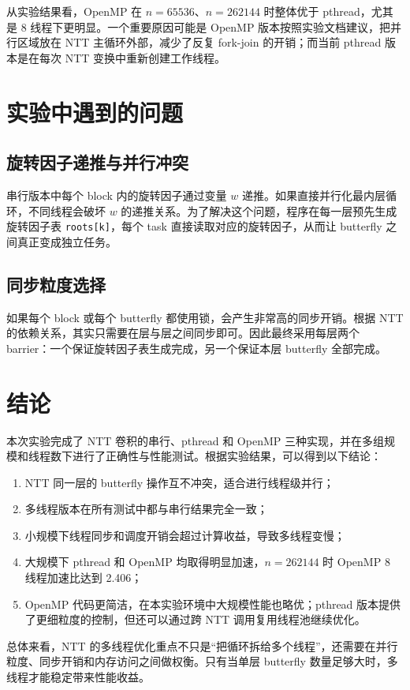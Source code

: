 \documentclass[a4paper,12pt]{ctexart}
\begin{document}
从实验结果看，OpenMP 在 $n=65536$、$n=262144$ 时整体优于 pthread，尤其是 8 线程下更明显。一个重要原因可能是 OpenMP 版本按照实验文档建议，把并行区域放在 NTT 主循环外部，减少了反复 fork-join 的开销；而当前 pthread 版本是在每次 NTT 变换中重新创建工作线程。

\section{实验中遇到的问题}

\subsection{旋转因子递推与并行冲突}

串行版本中每个 block 内的旋转因子通过变量 $w$ 递推。如果直接并行化最内层循环，不同线程会破坏 $w$ 的递推关系。为了解决这个问题，程序在每一层预先生成旋转因子表 \texttt{roots[k]}，每个 task 直接读取对应的旋转因子，从而让 butterfly 之间真正变成独立任务。

\subsection{同步粒度选择}

如果每个 block 或每个 butterfly 都使用锁，会产生非常高的同步开销。根据 NTT 的依赖关系，其实只需要在层与层之间同步即可。因此最终采用每层两个 barrier：一个保证旋转因子表生成完成，另一个保证本层 butterfly 全部完成。

\section{结论}

本次实验完成了 NTT 卷积的串行、pthread 和 OpenMP 三种实现，并在多组规模和线程数下进行了正确性与性能测试。根据实验结果，可以得到以下结论：

\begin{enumerate}
  \item NTT 同一层的 butterfly 操作互不冲突，适合进行线程级并行；
  \item 多线程版本在所有测试中都与串行结果完全一致；
  \item 小规模下线程同步和调度开销会超过计算收益，导致多线程变慢；
  \item 大规模下 pthread 和 OpenMP 均取得明显加速，$n=262144$ 时 OpenMP 8 线程加速比达到 2.406；
  \item OpenMP 代码更简洁，在本实验环境中大规模性能也略优；pthread 版本提供了更细粒度的控制，但还可以通过跨 NTT 调用复用线程池继续优化。
\end{enumerate}

总体来看，NTT 的多线程优化重点不只是“把循环拆给多个线程”，还需要在并行粒度、同步开销和内存访问之间做权衡。只有当单层 butterfly 数量足够大时，多线程才能稳定带来性能收益。
\end{document}
